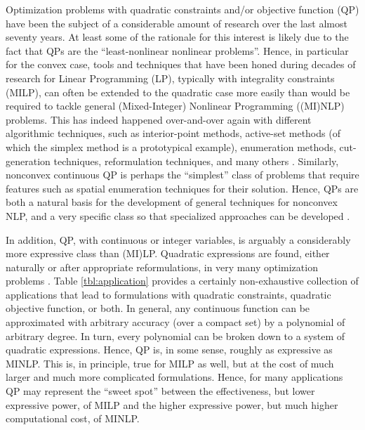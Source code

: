 Optimization problems with quadratic constraints and/or objective function (QP) have been the subject of a considerable amount of research over the last almost seventy years. At least some of the rationale for this interest is likely due to the fact that QPs are the ``least-nonlinear nonlinear problems''. Hence, in particular for the convex case, tools and techniques that have been honed during decades of research for Linear Programming (LP), typically with integrality constraints (MILP), can often be extended to the quadratic case more easily than would be required to tackle general (Mixed-Integer) Nonlinear Programming ((MI)NLP) problems. This has indeed happened over-and-over again with different algorithmic techniques, such as interior-point methods, active-set methods (of which the simplex method is a prototypical example), enumeration methods, cut-generation techniques, reformulation techniques, and many others \cite{BS09}.
Similarly, nonconvex continuous QP is perhaps the ``simplest'' class of problems that require features such as spatial enumeration techniques for their solution.
Hence, QPs are both a natural basis for the development of general techniques for nonconvex NLP, and a very specific class so that specialized approaches can be developed \cite{Dur2010,Burer2012}.

In addition, QP, with continuous or integer variables, is arguably a considerably more expressive class than (MI)LP. Quadratic expressions are found, either naturally or after appropriate reformulations, in very many optimization problems \cite{Kochenberger2014}. Table \ref{tbl:application} provides a certainly non-exhaustive collection of applications that lead to formulations with quadratic constraints, quadratic objective function, or both. In general, any continuous function can be approximated with arbitrary accuracy (over a compact set) by a polynomial of arbitrary degree. In turn, every polynomial can be broken down to a system of quadratic expressions. Hence, QP is, in some sense, roughly as expressive as MINLP. This is, in principle, true for MILP as well, but at the cost of much larger and much more complicated formulations. Hence, for many applications QP may represent the ``sweet spot'' between the effectiveness, but lower expressive power, of MILP and the higher expressive power, but much higher computational cost, of MINLP.



